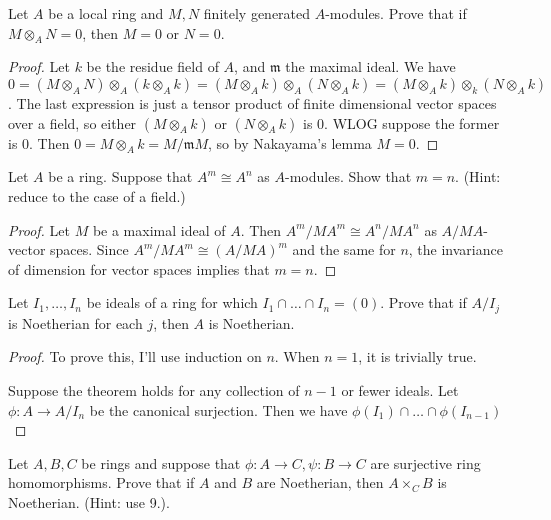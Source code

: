 \documentclass{article}
\begin{document}
 Let $A$ be a local ring and $M,N$ finitely generated $A$-modules. Prove that if $M \otimes_A  N = 0$, then $M = 0$ or $N = 0$.
\begin{proof}
Let $k$ be the residue field of $A$, and $\mathfrak{m}$ the maximal ideal.  We have $0 = (M \otimes_A N) \otimes_A (k \otimes_A k) = (M \otimes_A k) \otimes_A (N \otimes_A k) = (M \otimes_A k) \otimes_k (N \otimes_A k)$.  The last expression is just a tensor product of finite dimensional vector spaces over a field, so either $(M \otimes_A k)$ or $(N \otimes_A k)$ is 0.  WLOG suppose the former is 0. Then $0 = M \otimes_A k = M/\mathfrak{m}M$, so by Nakayama's lemma $M = 0$.
\end{proof}

 Let $A$ be a ring. Suppose that $A^m \cong A^n$ as $A$-modules.  Show that $m = n$. (Hint: reduce to the case of a field.)
\begin{proof}
Let $M$ be a maximal ideal of $A$.  Then $A^m/MA^m \cong A^n/MA^n$ as $A/MA$-vector spaces. Since $A^m/MA^m \cong (A/MA)^m$ and the same for $n$, the invariance of dimension for vector spaces implies that $m = n$.
\end{proof}


 Let $I_1, \ldots, I_n$ be ideals of a ring for which $I_1 \cap \ldots \cap I_n = (0)$. Prove that if $A/I_j$ is Noetherian for each $j$, then $A$ is Noetherian.
\begin{proof}
To prove this, I'll use induction on $n$.  When $n = 1$, it is trivially true.

Suppose the theorem holds for any collection of $n-1$ or fewer ideals.  Let $\phi:A \to A/I_n$ be the canonical surjection.  Then we have $\phi(I_1) \cap \ldots \cap \phi(I_{n-1})$
\end{proof}

 Let $A, B, C$ be rings and suppose that $\phi: A \to C, \psi: B \to C$ are surjective ring homomorphisms. Prove that if $A$ and $B$ are Noetherian, then $A \times_C B$ is Noetherian. (Hint: use 9.).
\end{document}
